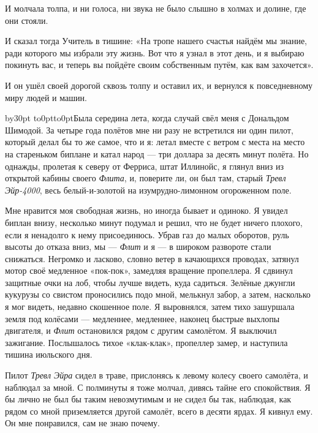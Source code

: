 И молчала толпа, и ни голоса, ни звука не было слышно в холмах и долине, где они стояли.

И сказал тогда Учитель в тишине: «На тропе нашего счастья найдём мы знание, ради которого мы
избрали эту жизнь. Вот что я узнал в этот день, и я выбираю покинуть вас, и теперь вы пойдёте
своим собственным путём, как вам захочется».

И он ушёл своей дорогой сквозь толпу и оставил их, и вернулся к повседневному миру людей и машин.

\endgroup
\vfil\eject

{}
\vskip3cm

\begingroup{}
\def\par{\endgraf\endgroup}
\advance\parindent by30pt \hang{}
\noindent\vtop to0pt{\kern-8pt\hbox to0pt{\hss\kern\parindent\bukvfont Б\kern3pt}\vss}ыла середина
лета, когда случай свёл меня с Дональдом Шимодой.
За четыре года полётов мне ни разу не встретился ни один пилот, который делал бы то же самое, что
и я: летал вместе с ветром с места на место на стареньком биплане и катал народ --- три доллара
за десять минут полёта. Но однажды, пролетая к северу от Ферриса, штат Иллинойс, я глянул вниз из
открытой кабины своего {\it Флита}, и, поверите ли, он был там, старый {\it Тревл Эйр-4000}, весь
белый-и-золотой на изумрудно-лимонном огороженном поле.

Мне нравится моя свободная жизнь, но иногда бывает и одиноко. Я увидел биплан внизу, несколько
минут подумал и решил, что не будет ничего плохого, если я ненадолго к нему присоединюсь. Убрав
газ до малых оборотов, руль высоты до отказа вниз, мы --- {\it Флит\/} и я --- в широком развороте стали
снижаться. Негромко и ласково, словно ветер в качающихся проводах, затянул мотор своё медленное
«пок-пок», замедляя вращение пропеллера. Я сдвинул защитные очки на лоб, чтобы лучше видеть, куда
садиться. Зелёные джунгли кукурузы со свистом проносились подо мной, мелькнул забор, а затем,
насколько я мог видеть, недавно скошенное поле. Я выровнялся, затем тихо зашуршала земля под
колёсами --- медленнее, медленнее, наконец быстрые выхлопы двигателя, и {\it Флит\/} остановился
рядом с другим самолётом. Я выключил зажигание. Послышалось тихое «клак-клак», пропеллер замер, и наступила тишина июльского дня.

Пилот {\it Тревл Эйра\/} сидел в траве, прислонясь к левому колесу своего самолёта, и наблюдал за мной. С полминуты я тоже молчал, дивясь тайне его спокойствия. Я бы лично не был бы таким невозмутимым и не сидел бы так, наблюдая, как рядом со мной приземляется другой самолёт, всего в десяти ярдах. Я кивнул ему. Он мне понравился, сам не знаю почему.

